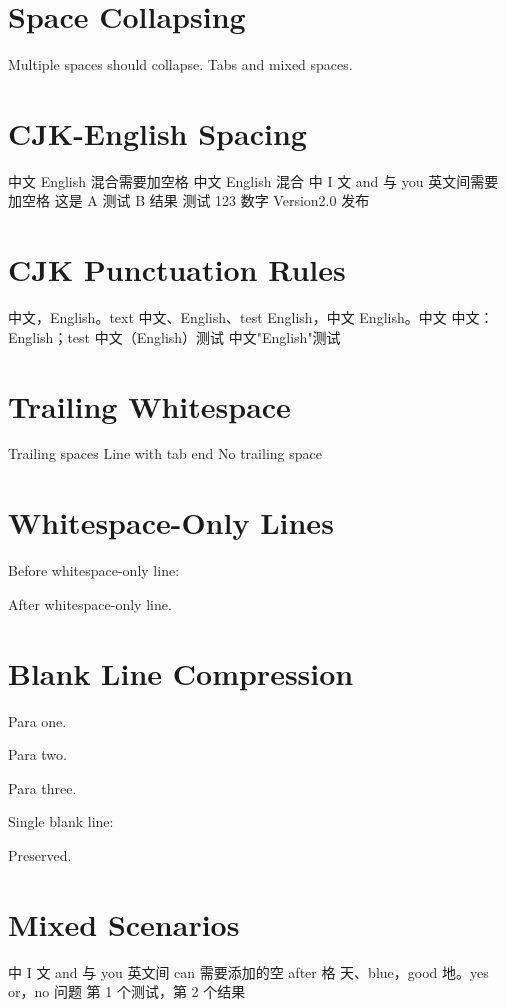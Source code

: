 \documentclass{article}
\begin{document}
\section{Space Collapsing}
Multiple spaces should collapse.
Tabs and mixed spaces.

\section{CJK-English Spacing}
中文 English 混合需要加空格
中文 English 混合
中 I 文 and 与 you 英文间需要加空格
这是 A 测试 B 结果
测试 123 数字
Version2.0 发布

\section{CJK Punctuation Rules}
中文，English。text
中文、English、test
English，中文
English。中文
中文：English；test
中文（English）测试
中文"English"测试

\section{Trailing Whitespace}
Trailing spaces
Line with tab end
No trailing space

\section{Whitespace-Only Lines}
Before whitespace-only line:

After whitespace-only line.

\section{Blank Line Compression}
Para one.

Para two.

Para three.

Single blank line:

Preserved.

\section{Mixed Scenarios}
中 I 文 and 与 you 英文间 can 需要添加的空 after 格
天、blue，good 地。yes or，no 问题
第 1 个测试，第 2 个结果
\end{document}
